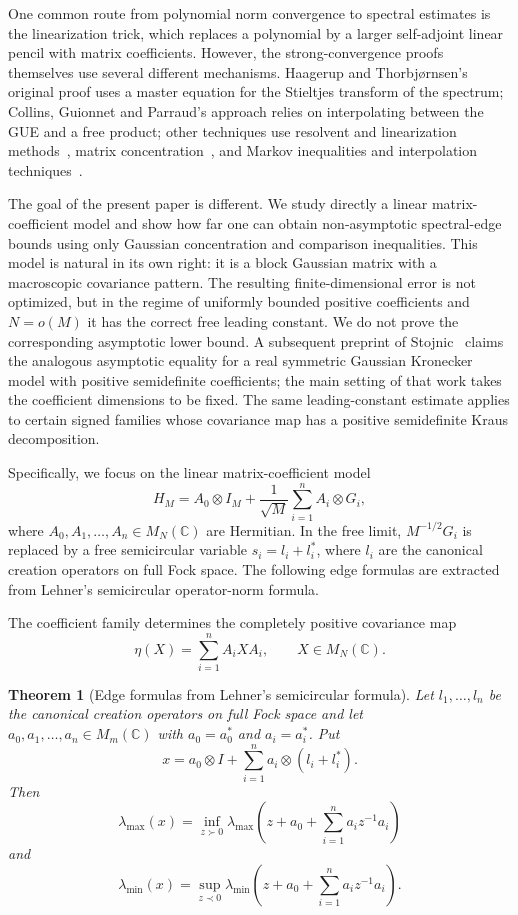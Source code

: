 \documentclass[10pt,a4paper]{amsart}
\newtheorem{theorem}{Theorem}[section]
\newcommand{\C}{\mathbb C}
\begin{document}
One common route from polynomial norm convergence to spectral estimates is the
linearization trick, which replaces a polynomial by a larger self-adjoint linear
pencil with matrix coefficients.  However, the strong-convergence proofs
themselves use several different mechanisms.  Haagerup and Thorbj\o rnsen's
original proof uses a master equation for the Stieltjes transform of the
spectrum; Collins, Guionnet and Parraud's approach relies on interpolating
between the GUE and a free product; other techniques use resolvent and
linearization methods~\cite{Anderson2013}, matrix
concentration~\cite{BBvH2023}, and Markov inequalities and interpolation
techniques~\cite{CGVTvHClassicalI,CGVvHClassical,vanHandelSurvey2025}.

The goal of the present paper is different.  We study directly a linear
matrix-coefficient model and show how far one can obtain non-asymptotic
spectral-edge bounds using only Gaussian concentration and comparison
inequalities.  This model is natural in its own right: it is a block Gaussian
matrix with a macroscopic covariance pattern.  The resulting finite-dimensional
error is not optimized, but in the regime of uniformly bounded positive
coefficients and $N=o(M)$ it has the correct free leading constant.  We do not
prove the corresponding asymptotic lower bound.  A subsequent preprint of
Stojnic~\cite{Stojnic2026} claims the analogous asymptotic equality for a real
symmetric Gaussian Kronecker model with positive semidefinite coefficients; the
main setting of that work takes the coefficient dimensions to be fixed.  The
same leading-constant estimate applies to
certain signed families whose covariance map has a positive semidefinite Kraus
decomposition.


Specifically, we focus on the linear matrix-coefficient model
\[
	H_M=A_0\otimes I_M+\frac1{\sqrt M}\sum_{i=1}^n A_i\otimes G_i,
\]
where $A_0,A_1,\ldots,A_n\in M_N(\C)$ are Hermitian.  In the
free limit, $M^{-1/2}G_i$ is replaced by a free semicircular variable
$s_i=l_i+l_i^*$, where $l_i$ are the canonical creation operators on full Fock
space.  The following edge formulas are extracted from Lehner's semicircular
operator-norm formula.

The coefficient family determines the completely positive covariance map
\begin{equation}
	\label{eq:covariance-map}
	\eta(X)=\sum_{i=1}^n A_iXA_i,\qquad X\in M_N(\C).
\end{equation}


\begin{theorem}[Edge formulas from Lehner's semicircular formula]
	\label{thm:lehner}
	Let $l_1,\ldots,l_n$ be the canonical creation operators on full Fock space and
	let $a_0,a_1,\ldots,a_n\in M_m(\C)$ with $a_0=a_0^*$ and $a_i=a_i^*$.  Put
	\[
		x=a_0\otimes I+\sum_{i=1}^n a_i\otimes(l_i+l_i^*).
	\]
	Then
	\[
		\lambda_{\max}(x)
		=
		\inf_{z\succ0}\lambda_{\max}\left(z+a_0+\sum_{i=1}^n a_iz^{-1}a_i\right)
	\]
	and
	\[
		\lambda_{\min}(x)
		=
		\sup_{z\prec0}\lambda_{\min}\left(z+a_0+\sum_{i=1}^n a_iz^{-1}a_i\right).
	\]
\end{theorem}
\end{document}
